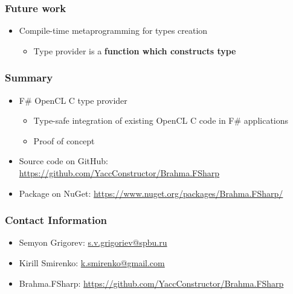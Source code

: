 \documentclass[xcolor=table]{beamer}
\begin{document}
\begin{frame}
  \transwipe[direction=90]
  \frametitle{Future work}
\begin{itemize}
 \item Compile-time metaprogramming for types creation
 \begin{itemize}
  \item Type provider is a \textbf{function which constructs type}
 \end{itemize}

\end{itemize}

\end{frame}




\begin{frame}
  \transwipe[direction=90]
  \frametitle{Summary}
\begin{itemize}
\item F\# OpenCL C type provider
\begin {itemize}
\item Type-safe integration of existing OpenCL C code in F\# applications
\item Proof of concept
\end{itemize}
\vspace{1cm}
\item Source code on GitHub: \url{https://github.com/YaccConstructor/Brahma.FSharp}
\item Package on NuGet: \url{https://www.nuget.org/packages/Brahma.FSharp/}
\end{itemize}
\end{frame}

\begin{frame}
\transwipe[direction=90]
\frametitle{Contact Information}
\begin{itemize}
  \item Semyon Grigorev: \href{mailto:s.v.grigoriev@spbu.ru}{s.v.grigoriev@spbu.ru}
  \item Kirill Smirenko: \href{mailto:k.smirenko@gmail.com}{k.smirenko@gmail.com}
\end{itemize}
\begin{itemize}
  \item Brahma.FSharp: \href{https://github.com/YaccConstructor/Brahma.FSharp}{https://github.com/YaccConstructor/Brahma.FSharp}
\end{itemize}
\hspace{2cm}
\end{frame}
\end{document}
